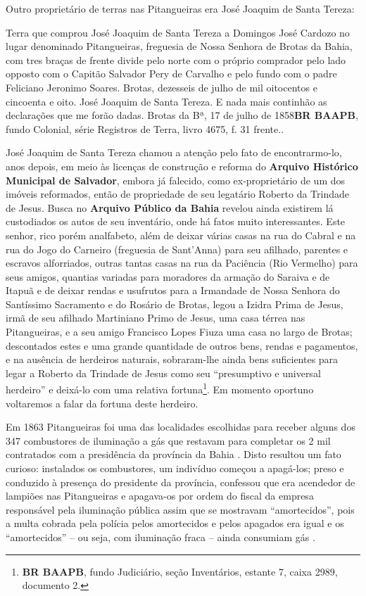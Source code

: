 Outro proprietário de terras nas Pitangueiras era José Joaquim de Santa Tereza:

\begin{citacao}
Terra que comprou José Joaquim de Santa Tereza a Domingos José Cardozo no lugar denominado Pitangueiras, freguesia de Nossa Senhora de Brotas da Bahia, com tres braças de frente divide pelo norte com o próprio comprador pelo lado opposto com o Capitão Salvador Pery de Carvalho e pelo fundo com o padre Feliciano Jeronimo Soares. Brotas, dezesseis de julho de mil oitocentos e cincoenta e oito. José Joaquim de Santa Tereza. E nada mais continhão as declarações que me forão dadas. Brotas da Bª, 17 de julho de 1858{\textbf{BR BAAPB}, fundo Colonial, série Registros de Terra, livro 4675, f. 31 frente.}.
\end{citacao}

José Joaquim de Santa Tereza chamou a atenção pelo fato de encontrarmo-lo, anos depois, em meio às licenças de construção e reforma do \textbf{Arquivo Histórico Municipal de Salvador}, embora já falecido, como ex-proprietário de um dos imóveis reformados, então de propriedade de seu legatário Roberto da Trindade de Jesus. Busca no \textbf{Arquivo Público da Bahia} revelou ainda existirem lá custodiados os autos de seu inventário, onde há fatos muito interessantes. Este senhor, rico porém analfabeto, além de deixar várias casas na rua do Cabral e na rua do Jogo do Carneiro (freguesia de Sant'Anna) para seu afilhado, parentes e escravos alforriados, outras tantas casas na rua da Paciência (Rio Vermelho) para seus amigos, quantias variadas para moradores da armação do Saraiva e de Itapuã e de deixar rendas e usufrutos para a Irmandade de Nossa Senhora do Santíssimo Sacramento e do Rosário de Brotas, legou a Izidra Prima de Jesus, irmã de seu afilhado Martiniano Primo de Jesus, uma casa térrea nas Pitangueiras, e a seu amigo Francisco Lopes Fiuza uma casa no largo de Brotas; descontados estes e uma grande quantidade de outros bens, rendas e pagamentos, e na ausência de herdeiros naturais, sobraram-lhe ainda bens suficientes para legar a Roberto da Trindade de Jesus como seu ``presumptivo e universal herdeiro'' e deixá-lo com uma relativa fortuna\footnote{\textbf{BR BAAPB}, fundo Judiciário, seção Inventários, estante 7, caixa 2989, documento 2.}. Em momento oportuno voltaremos a falar da fortuna deste herdeiro. 

Em 1863 Pitangueiras foi uma das localidades escolhidas para receber alguns dos 347 combustores de iluminação a gás que restavam para completar os 2 mil contratados com a presidência da província da Bahia \cite[p.~52]{bahia_rpe_1863}. Disto resultou um fato curioso: instalados os combustores, um indivíduo começou a apagá-los; preso e conduzido à presença do presidente da província, confessou que era acendedor de lampiões nas Pitangueiras e apagava-os por ordem do fiscal da empresa responsável pela iluminação pública assim que se mostravam ``amortecidos'', pois a multa cobrada pela polícia pelos amortecidos e pelos apagados era igual e os ``amortecidos'' -- ou seja, com iluminação fraca -- ainda consumiam gás \cite[relat.~chefe~polícia,~p.~25]{bahia_rpe_1870}. 

